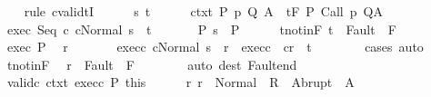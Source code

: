 \begin{isabellebody}
\ \ \isamarkupfalse%
\ {\isacharparenleft}rule\ cvalidtI{\isacharparenright}\isanewline
\ \ \ \ \isamarkupfalse%
\ s\ t\isanewline
\ \ \ \ \isamarkupfalse%
\ ctxt{\isacharcolon}\ {\isachardoublequoteopen}{\isasymforall}{\isacharparenleft}P{\isacharcomma}\ p{\isacharcomma}\ Q{\isacharcomma}\ A{\isacharparenright}{\isasymin}{\isasymTheta}{\isachardot}\ {\isasymGamma}\ {\isasymTurnstile}\isactrlsub t\isactrlbsub {\isacharslash}F\isactrlesub \ P\ {\isacharparenleft}Call\ p{\isacharparenright}\ Q{\isacharcomma}A{\isachardoublequoteclose}\isanewline
\ \ \ \ \isamarkupfalse%
\ exec{\isacharcolon}\ {\isachardoublequoteopen}{\isasymGamma}{\isasymturnstile}{\isasymlangle}Seq\ c{}\ c{}{\isacharcomma}Normal\ s{\isasymrangle}\ {\isasymRightarrow}\ t{\isachardoublequoteclose}\ \isanewline
\ \ \ \ \isamarkupfalse%
\ P{\isacharcolon}\ {\isachardoublequoteopen}s\ {\isasymin}\ P{\isachardoublequoteclose}\isanewline
\ \ \ \ \isamarkupfalse%
\ t{\isacharunderscore}notin{\isacharunderscore}F{\isacharcolon}\ {\isachardoublequoteopen}t\ {\isasymnotin}\ Fault\ {\isacharbackquote}\ F{\isachardoublequoteclose}\isanewline
\ \ \ \ \isamarkupfalse%
\ exec\ P\ \isamarkupfalse%
\ r\ \isanewline
\ \ \ \ \ \ exec{\isacharunderscore}c{}{\isacharcolon}\ {\isachardoublequoteopen}{\isasymGamma}{\isasymturnstile}{\isasymlangle}c{}{\isacharcomma}Normal\ s{\isasymrangle}\ {\isasymRightarrow}\ r{\isachardoublequoteclose}\ \ exec{\isacharunderscore}c{}{\isacharcolon}\ \ {\isachardoublequoteopen}{\isasymGamma}{\isasymturnstile}{\isasymlangle}c{}{\isacharcomma}r{\isasymrangle}\ {\isasymRightarrow}\ t{\isachardoublequoteclose}\isanewline
\ \ \ \ \ \ \isamarkupfalse%
\ cases\ auto\isanewline
\ \ \ \ \isamarkupfalse%
\ t{\isacharunderscore}notin{\isacharunderscore}F\ \isamarkupfalse%
\ {\isachardoublequoteopen}r\ {\isasymnotin}\ Fault\ {\isacharbackquote}\ F{\isachardoublequoteclose}\isanewline
\ \ \ \ \ \ \isamarkupfalse%
\ {\isacharparenleft}auto\ dest{\isacharcolon}\ Fault{\isacharunderscore}end{\isacharparenright}\isanewline
\ \ \ \ \isamarkupfalse%
\ valid{\isacharunderscore}c{}\ ctxt\ exec{\isacharunderscore}c{}\ P\ this\isanewline
\ \ \ \ \isamarkupfalse%
\ r{\isacharcolon}\ {\isachardoublequoteopen}r\ {\isasymin}\ Normal\ {\isacharbackquote}\ R\ {\isasymunion}\ Abrupt\ {\isacharbackquote}\ A{\isachardoublequoteclose}\isanewline

\end{isabellebody}
